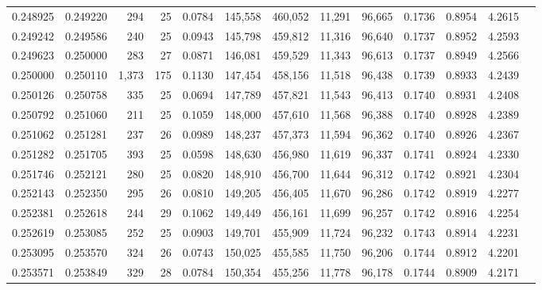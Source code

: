 \begin{tabular}{rrrrrrrrrrrrr}
0.248925 & 0.249220 &    294 &    25 &                                     0.0784 & 145,558 & 460,052 &  11,291 &  96,665 & 0.1736 & 0.8954 & 4.2615 \\
0.249242 & 0.249586 &    240 &    25 &                                     0.0943 & 145,798 & 459,812 &  11,316 &  96,640 & 0.1737 & 0.8952 & 4.2593 \\
0.249623 & 0.250000 &    283 &    27 &                                     0.0871 & 146,081 & 459,529 &  11,343 &  96,613 & 0.1737 & 0.8949 & 4.2566 \\
0.250000 & 0.250110 &  1,373 &   175 &                                     0.1130 & 147,454 & 458,156 &  11,518 &  96,438 & 0.1739 & 0.8933 & 4.2439 \\
0.250126 & 0.250758 &    335 &    25 &                                     0.0694 & 147,789 & 457,821 &  11,543 &  96,413 & 0.1740 & 0.8931 & 4.2408 \\
0.250792 & 0.251060 &    211 &    25 &                                     0.1059 & 148,000 & 457,610 &  11,568 &  96,388 & 0.1740 & 0.8928 & 4.2389 \\
0.251062 & 0.251281 &    237 &    26 &                                     0.0989 & 148,237 & 457,373 &  11,594 &  96,362 & 0.1740 & 0.8926 & 4.2367 \\
0.251282 & 0.251705 &    393 &    25 &                                     0.0598 & 148,630 & 456,980 &  11,619 &  96,337 & 0.1741 & 0.8924 & 4.2330 \\
0.251746 & 0.252121 &    280 &    25 &                                     0.0820 & 148,910 & 456,700 &  11,644 &  96,312 & 0.1742 & 0.8921 & 4.2304 \\
0.252143 & 0.252350 &    295 &    26 &                                     0.0810 & 149,205 & 456,405 &  11,670 &  96,286 & 0.1742 & 0.8919 & 4.2277 \\
0.252381 & 0.252618 &    244 &    29 &                                     0.1062 & 149,449 & 456,161 &  11,699 &  96,257 & 0.1742 & 0.8916 & 4.2254 \\
0.252619 & 0.253085 &    252 &    25 &                                     0.0903 & 149,701 & 455,909 &  11,724 &  96,232 & 0.1743 & 0.8914 & 4.2231 \\
0.253095 & 0.253570 &    324 &    26 &                                     0.0743 & 150,025 & 455,585 &  11,750 &  96,206 & 0.1744 & 0.8912 & 4.2201 \\
0.253571 & 0.253849 &    329 &    28 &                                     0.0784 & 150,354 & 455,256 &  11,778 &  96,178 & 0.1744 & 0.8909 & 4.2171 \\

\end{tabular}
